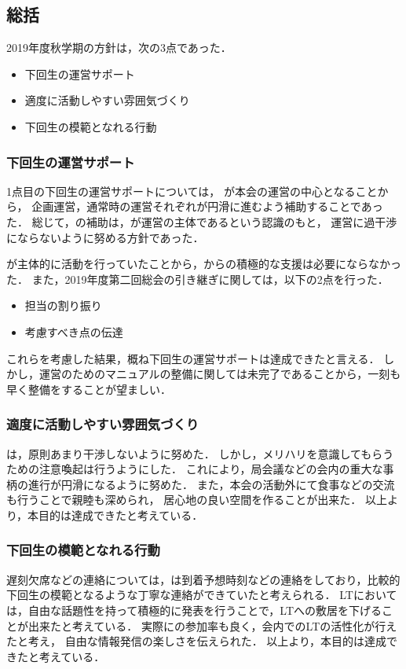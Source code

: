 \subsection*{\thirdGrade{}総括}


2019年度秋学期の\thirdGrade{}方針は，次の3点であった．
\begin {itemize}
	\item 下回生の運営サポート
	\item 適度に活動しやすい雰囲気づくり
    \item 下回生の模範となれる行動
\end {itemize}

\subsubsection*{下回生の運営サポート}

1点目の下回生の運営サポートについては，
\secondGrade{}が本会の運営の中心となることから，
企画運営，通常時の運営それぞれが円滑に進むよう補助することであった．
総じて，\thirdGrade{}の補助は，\secondGrade{}が運営の主体であるという認識のもと，
運営に過干渉にならないように努める方針であった．

\secondGrade{}が主体的に活動を行っていたことから，\thirdGrade{}からの積極的な支援は必要にならなかった．
また，2019年度第二回総会の引き継ぎに関しては，以下の2点を行った．

\begin {itemize}
	\item 担当の割り振り
	\item 考慮すべき点の伝達
\end {itemize}

これらを考慮した結果，概ね下回生の運営サポートは達成できたと言える．
しかし，運営のためのマニュアルの整備に関しては未完了であることから，一刻も早く整備をすることが望ましい．

\subsubsection*{適度に活動しやすい雰囲気づくり}
\thirdGrade{}は，原則あまり干渉しないように努めた．
しかし，メリハリを意識してもらうための注意喚起は行うようにした．
これにより，局会議などの会内の重大な事柄の進行が円滑になるように努めた．
また，本会の活動外にて食事などの交流も行うことで親睦も深められ，
居心地の良い空間を作ることが出来た．
以上より，本目的は達成できたと考えている．

\subsubsection*{下回生の模範となれる行動}
遅刻欠席などの連絡については，\thirdGrade{}は到着予想時刻などの連絡をしており，比較的下回生の模範となるような丁寧な連絡ができていたと考えられる．
LTにおいては，自由な話題性を持って積極的に発表を行うことで，LTへの敷居を下げることが出来たと考えている．
実際に\firstGrade{}の参加率も良く，会内でのLTの活性化が行えたと考え，
自由な情報発信の楽しさを伝えられた．
以上より，本目的は達成できたと考えている．
